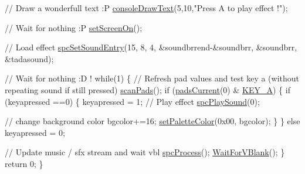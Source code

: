 \begin{DoxyCodeInclude}
    \textcolor{comment}{// Draw a wonderfull text :P}
    \hyperlink{a00320_a7e52d15b5a1befa42f5758de19dfb70c}{consoleDrawText}(5,10,\textcolor{stringliteral}{"Press A to play effect !"});

    \textcolor{comment}{// Wait for nothing :P}
    \hyperlink{a00353_abc7d4ef8ebc22f5b710927909bb3f144}{setScreenOn}();  

    \textcolor{comment}{// Load effect}
    \hyperlink{a00347_a4ef9d5d4b7618a2e091194b6c17f75a5}{spcSetSoundEntry}(15, 8, 4, &soundbrrend-&soundbrr, &soundbrr, &tadasound);
    
    \textcolor{comment}{// Wait for nothing :D !}
    \textcolor{keywordflow}{while}(1) \{
        \textcolor{comment}{// Refresh pad values and test key a (without repeating sound if still pressed)}
        \hyperlink{a00335_a42632e79292dc47a567aab4dc3e4407d}{scanPads}();
        \textcolor{keywordflow}{if} (\hyperlink{a00335_a6063e0eec9a36e437fc32951acafa44c}{padsCurrent}(0) & \hyperlink{a00335_aa27cad8fa018a58930b6622783a83072aa7b3a3d0503a46bec51c6e3da95747cc}{KEY\_A}) \{
            \textcolor{keywordflow}{if} (keyapressed ==0) \{ 
                keyapressed = 1;
                \textcolor{comment}{// Play effect}
                \hyperlink{a00347_a8e5286554841ea48b028b4b782364ab0}{spcPlaySound}(0);

                \textcolor{comment}{// change background color}
                bgcolor+=16;
                \hyperlink{a00353_a549263481ac687a7e1d6f6cd5bd85d29}{setPaletteColor}(0x00, bgcolor);
            \}
        \}
        \textcolor{keywordflow}{else}
            keyapressed = 0;
            
        \textcolor{comment}{// Update music / sfx stream and wait vbl}
        \hyperlink{a00347_acab7d87110bac6baa9d74ab314772c98}{spcProcess}();
        \hyperlink{a00326_a815e2626bd26d0e936d507a363ecd723}{WaitForVBlank}();
    \}
    \textcolor{keywordflow}{return} 0;
\}
\end{DoxyCodeInclude}
 